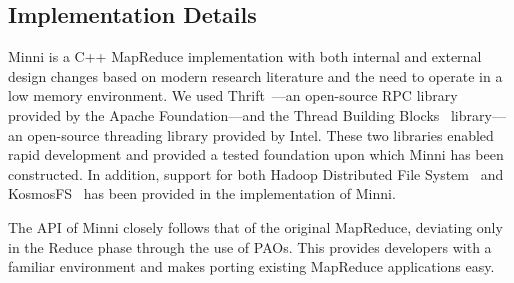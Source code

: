 \documentclass[10pt,letter,final,article,twocolumn]{article} %
\newcommand{\rpc}[1]{\emph{#1}}
\begin{document}
\subsection{Implementation Details}

Minni is a C++ MapReduce implementation with both internal and external design changes based on modern research literature and the need to operate in a low memory environment.  We used Thrift~\citep{thrift10}---an open-source RPC library provided by the Apache Foundation---and the Thread Building Blocks~\citep{intel10} library---an open-source threading library provided by Intel.  These two libraries enabled rapid development and provided a tested
foundation upon which Minni has been constructed.  In addition, support for both Hadoop Distributed File System~\citep{hadoop10} and KosmosFS~\citep{kfs10} has been provided in the implementation of Minni.

The API of Minni closely follows that of the original MapReduce, deviating only in the Reduce phase through the use of PAOs.  This provides developers with a familiar environment and makes porting existing MapReduce applications easy.

%
%
%
\end{document}
